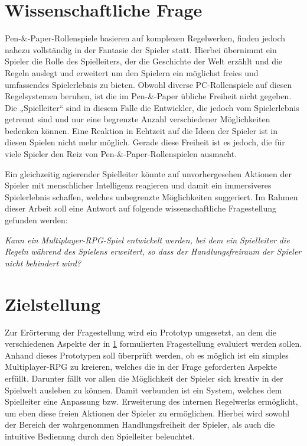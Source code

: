 \section{Wissenschaftliche Frage}
\label{sec:WissenschaftlicheFrage}

Pen-\&-Paper-Rollenspiele basieren auf komplexen Regelwerken, finden jedoch nahezu vollständig in der Fantasie der Spieler statt. Hierbei übernimmt ein Spieler die Rolle des Spielleiters, der die Geschichte der Welt erzählt und die Regeln auslegt und erweitert um den Spielern ein möglichst freies und umfassendes Spielerlebnis zu bieten. Obwohl diverse PC-Rollenspiele auf diesen Regelsystemen beruhen, ist die im Pen-\&-Paper übliche Freiheit nicht gegeben. Die „Spielleiter“ sind in diesem Falle die Entwickler, die jedoch vom Spielerlebnis getrennt sind und nur eine begrenzte Anzahl verschiedener Möglichkeiten bedenken können. Eine Reaktion in Echtzeit auf die Ideen der Spieler ist in diesen Spielen nicht mehr möglich. Gerade diese Freiheit ist es jedoch, die für viele Spieler den Reiz von Pen-\&-Paper-Rollenspielen ausmacht.

Ein gleichzeitig agierender Spielleiter könnte auf unvorhergesehen Aktionen der Spieler mit menschlicher Intelligenz reagieren und damit ein immersiveres Spielerlebnis schaffen, welches unbegrenzte Möglichkeiten suggeriert.
Im Rahmen dieser Arbeit soll eine Antwort auf folgende wissenschaftliche Fragestellung gefunden werden:
\vspace*{0.5em}\begin{center}\parbox{0.9\linewidth}{
  \emph{Kann ein Multiplayer-RPG-Spiel entwickelt werden, bei dem ein Spielleiter die Regeln während des Spielens erweitert, so dass der Handlungsfreiraum der Spieler nicht behindert wird?}
} \end{center}\vspace*{0.5em}

\section{Zielstellung}
\label{sec:Zielstellung}

Zur Erörterung der Fragestellung wird ein Prototyp umgesetzt, an dem die verschiedenen Aspekte der in \ref{sec:WissenschaftlicheFrage} formulierten Fragestellung evaluiert werden sollen. Anhand dieses Prototypen soll überprüft werden, ob es möglich ist ein simples Multiplayer-RPG zu kreieren, welches die in der Frage geforderten Aspekte erfüllt. Darunter fällt vor allen die Möglichkeit der Spieler sich kreativ in der Spielwelt ausleben zu können. Damit verbunden ist ein System, welches dem Spielleiter eine Anpassung bzw. Erweiterung des internen Regelwerks ermöglicht, um eben diese freien Aktionen der Spieler zu ermöglichen. Hierbei wird sowohl der Bereich der wahrgenommen Handlungsfreiheit der Spieler, als auch die intuitive Bedienung durch den Spielleiter beleuchtet.

